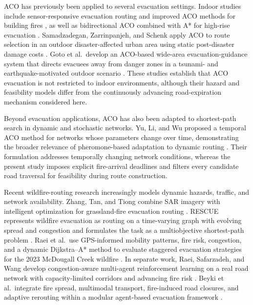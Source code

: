 \documentclass{ai-lab-report}
\begin{document}
ACO has previously been applied to several evacuation settings. Indoor studies include sensor-responsive evacuation routing and improved ACO methods for building fires \citep{xu2022evacuation}, as well as bidirectional ACO combined with A* for high-rise evacuation \citep{wang2022bidirectional}. Samadzadegan, Zarrinpanjeh, and Schenk apply ACO to route selection in an outdoor disaster-affected urban area using static post-disaster damage costs \citep{samadzadegan2011aco}. Goto et al.\ develop an ACO-based wide-area evacuation-guidance system that directs evacuees away from danger zones in a tsunami- and earthquake-motivated outdoor scenario \citep{goto2016guidance}. These studies establish that ACO evacuation is not restricted to indoor environments, although their hazard and feasibility models differ from the continuously advancing road-expiration mechanism considered here.

Beyond evacuation applications, ACO has also been adapted to shortest-path search in dynamic and stochastic networks. Yu, Li, and Wu proposed a temporal ACO method for networks whose parameters change over time, demonstrating the broader relevance of pheromone-based adaptation to dynamic routing \citep{yu2010temporal}. Their formulation addresses temporally changing network conditions, whereas the present study imposes explicit fire-arrival deadlines and filters every candidate road traversal for feasibility during route construction.

Recent wildfire-routing research increasingly models dynamic hazards, traffic, and network availability. Zhang, Tan, and Tiong combine SAR imagery with intelligent optimization for grassland-fire evacuation routing \citep{zhang2025grassland}. RESCUE represents wildfire evacuation as routing on a time-varying graph with evolving spread and congestion and formulates the task as a multiobjective shortest-path problem \citep{tammali2026rescue}. Raei et al.\ use GPS-informed mobility patterns, fire risk, congestion, and a dynamic Dijkstra--A* method to evaluate staggered evacuation strategies for the 2023 McDougall Creek wildfire \citep{raei2026mcdougall}. In separate work, Raei, Safarzadeh, and Wang develop congestion-aware multi-agent reinforcement learning on a real road network with capacity-limited corridors and advancing fire risk \citep{raei2026congestion}. Beyki et al.\ integrate fire spread, multimodal transport, fire-induced road closures, and adaptive rerouting within a modular agent-based evacuation framework \citep{beyki2026modular}.
\end{document}
